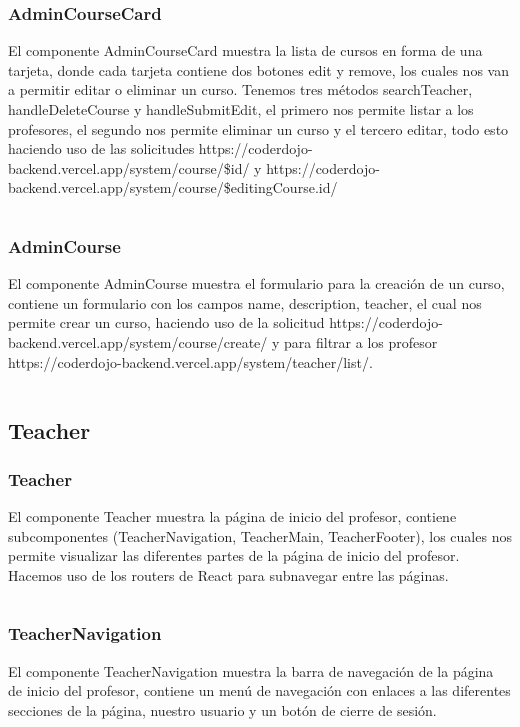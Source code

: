 \documentclass{article}
\begin{document}
\subsubsection{AdminCourseCard}
El componente AdminCourseCard muestra la lista de cursos en forma de una tarjeta, donde cada tarjeta contiene dos botones edit y remove, los cuales nos van a permitir editar o eliminar un curso. Tenemos tres métodos searchTeacher, handleDeleteCourse y handleSubmitEdit, el primero nos permite listar a los profesores, el segundo nos permite eliminar un curso y el tercero editar, todo esto haciendo uso de las solicitudes https://coderdojo-backend.vercel.app/system/course/\${id}/ y https://coderdojo-backend.vercel.app/system/course/\${editingCourse.id}/
\inputminted{javascript}{../fronted/src/designUI/Admin/AdminCourseCard.jsx}
\subsubsection{AdminCourse}
El componente AdminCourse muestra el formulario para la creación de un curso, contiene un formulario con los campos name, description, teacher, el cual nos permite crear un curso, haciendo uso de la solicitud https://coderdojo-backend.vercel.app/system/course/create/ y para filtrar a los profesor https://coderdojo-backend.vercel.app/system/teacher/list/.
\inputminted{javascript}{../fronted/src/designUI/Admin/AdminCourse.jsx}

\subsection{Teacher}
\subsubsection{Teacher}
El componente Teacher muestra la página de inicio del profesor, contiene subcomponentes (TeacherNavigation, TeacherMain, TeacherFooter), los cuales nos permite visualizar las diferentes partes de la página de inicio del profesor. Hacemos uso de los routers de React para subnavegar entre las páginas.
\inputminted{javascript}{../fronted/src/designUI/Teacher/Teacher.jsx}
\subsubsection{TeacherNavigation}
El componente TeacherNavigation muestra la barra de navegación de la página de inicio del profesor, contiene un menú de navegación con enlaces a las diferentes secciones de la página, nuestro usuario y un botón de cierre de sesión.
\inputminted{javascript}{../fronted/src/designUI/Teacher/TeacherNavigation.jsx}
\end{document}
